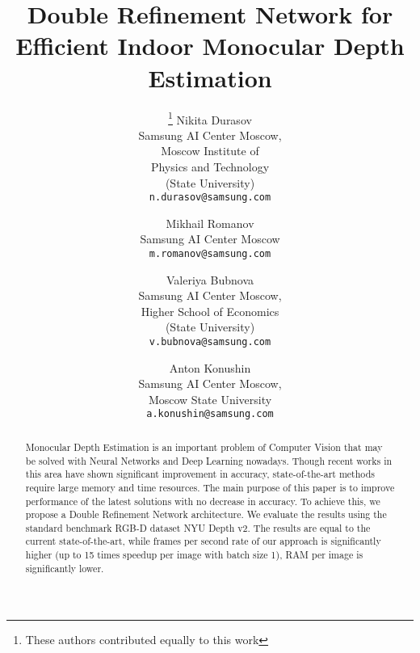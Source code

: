 \documentclass[10pt,twocolumn,letterpaper]{article}
\begin{document}
\title{Double Refinement Network for Efficient Indoor Monocular Depth Estimation}

\author{
\thanks{These authors contributed equally to this work}
Nikita Durasov\\
Samsung AI Center Moscow,\\
Moscow Institute of \\ 
Physics and Technology \\
(State University)\\
{\tt\small n.durasov@samsung.com}
\and
\footnotemark[1]
Mikhail Romanov\\
Samsung AI Center Moscow \\
{\tt\small m.romanov@samsung.com}
\and
\footnotemark[1]
Valeriya Bubnova\\
Samsung AI Center Moscow, \\
Higher School of Economics \\
(State University) \\
{\tt\small v.bubnova@samsung.com}
\and
Anton Konushin \\
Samsung AI Center Moscow, \\
Moscow State University \\
{\tt\small a.konushin@samsung.com}
}


\maketitle

\begin{abstract}
Monocular Depth Estimation is an important problem of Computer Vision that may be solved with Neural Networks and Deep Learning nowadays. Though recent works in this area have shown significant improvement in accuracy, state-of-the-art methods require large memory and time resources. The main purpose of this paper is to improve performance of the latest solutions with no decrease in accuracy. To achieve this, we propose a Double Refinement Network architecture. We evaluate the results using the standard benchmark RGB-D dataset NYU Depth v2. The results are equal to the current state-of-the-art, while frames per second rate of our approach is significantly higher (up to 15 times speedup per image with batch size 1), RAM per image is significantly lower.
\end{abstract}
\end{document}
